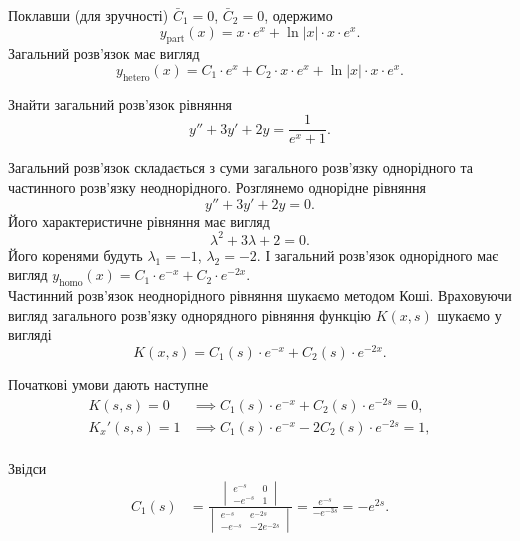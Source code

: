 \begin{solution}
	Поклавши (для зручності) $\bar C_1 = 0$, $\bar C_2 = 0$, одержимо
	\begin{equation*}
		y_{\text{part}}(x) = x \cdot e^x + \ln |x| \cdot x \cdot e^x.
	\end{equation*}
	Загальний розв’язок має вигляд
	\begin{equation*}
		y_{\text{hetero}}(x) = C_1 \cdot e^x + C_2 \cdot x \cdot e^x + \ln |x| \cdot x \cdot e^x.
	\end{equation*}
\end{solution}

\begin{example}
	Знайти загальний розв’язок рівняння \[y'' + 3 y' + 2 y = \frac{1}{e^x + 1}.\]
\end{example}
\begin{solution}
	Загальний розв’язок складається з суми загального роз\-в'яз\-ку однорідного та частинного роз\-в'яз\-ку неоднорідного. Розглянемо однорідне рівняння
	\begin{equation*}
		y'' + 3 y ' + 2 y = 0.
	\end{equation*}
	Його характеристичне рівняння має вигляд
	\begin{equation*}
		\lambda^2 + 3 \lambda + 2 = 0.
	\end{equation*}
	Його коренями будуть $\lambda_1 = - 1$, $\lambda_2 = -2$. І загальний розв’язок однорідного має вигляд $y_{\text{homo}}(x) = C_1 \cdot e^{-x} + C_2 \cdot e^{-2x}$. \\

	Частинний розв’язок неоднорідного рівняння шукаємо методом Коші. Враховуючи вигляд загального роз\-в'яз\-ку однорядного рівняння функцію $K(x, s)$ шукаємо у вигляді
	\begin{equation*}
		K(x, s) = C_1(s) \cdot e^{-x} + C_2(s) \cdot e^{-2x}.
	\end{equation*}

	Початкові умови дають наступне
	\begin{align*}
		K(s, s) = 0 &\implies C_1(s) \cdot e^{-x} + C_2(s) \cdot e^{-2s} = 0, \\
		K_x'(s, s) = 1 &\implies C_1(s) \cdot e^{-x} - 2 C_2(s) \cdot e^{-2s} = 1, \\
	\end{align*}

	Звідси
	\begin{align*}
		C_1(s) &= \frac{\begin{vmatrix} e^{-s} & 0 \\ -e^{-s} & 1 \end{vmatrix}}{\begin{vmatrix} e^{-s} & e^{-2s} \\ -e^{-s} & -2e^{-2s} \end{vmatrix}} = \frac{e^{-s}}{-e^{-3s}} = -e^{2s}.
	\end{align*}


\end{solution}
